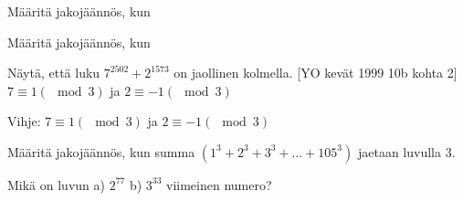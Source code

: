 \setcounter{tehtava}{0}

\begin{tehtavasivu}

\begin{tehtava}
  Määritä jakojäännös, kun
  \begin{alakohdat}
  \end{alakohdat}
  \begin{vastaus}
  \begin{alakohdat}
  \end{alakohdat}
  \end{vastaus}
\end{tehtava}


\begin{tehtava}
  Määritä jakojäännös, kun
  \begin{alakohdat}
  \end{alakohdat}
  \begin{vastaus}
  \begin{alakohdat}
  \end{alakohdat}
  \end{vastaus}
\end{tehtava}

\begin{tehtava}
  Näytä, että luku $7^{2502} + 2^{1573}$ on jaollinen kolmella. [YO kevät 1999 10b kohta 2]
  $7 \equiv 1 (\mod{3})$ ja $2 \equiv -1 (\mod{3})$
  \begin{vastaus}
  Vihje: $7 \equiv 1 (\mod{3})$ ja $2 \equiv -1 (\mod{3})$
  \end{vastaus}
\end{tehtava}

\begin{tehtava}
  Määritä jakojäännös, kun summa $(1^3 + 2^3 + 3^3 + \ldots + 105^3)$ jaetaan luvulla $3$.
\end{tehtava}

\begin{tehtava}
  Mikä on luvun a) $2^{77}$ b) $3^{33}$ viimeinen numero?
\end{tehtava}


\end{tehtavasivu}
